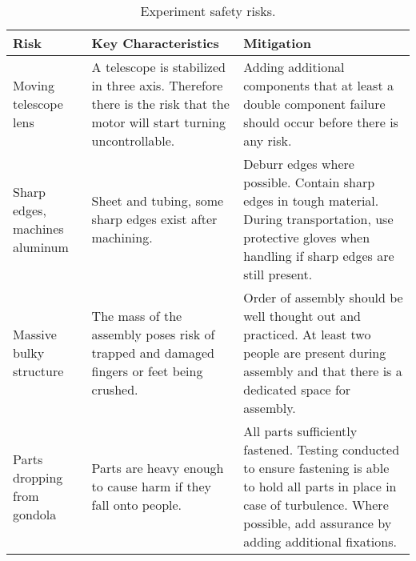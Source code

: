 \begin{table}[H]
    \centering
    \begin{tabular}{|m{}|m{}|m{}|}
    	\hline
    	\textbf{Risk} & \textbf{Key Characteristics} & \textbf{Mitigation} \\\hline
    	
    	Moving telescope lens & 
    	A telescope is stabilized in three axis. Therefore there is the risk that the motor will start turning uncontrollable. &
    	Adding additional components that at least a double component failure should occur before there is any risk. \\\hline
    	
    	Sharp edges, machines aluminum &
    	Sheet and tubing, some sharp edges exist after machining. &
    	Deburr edges where possible. Contain sharp edges in tough material. During transportation, use protective gloves when handling if sharp edges are still present. \\\hline
    	
    	Massive bulky structure &
    	The mass of the assembly poses risk of trapped and damaged fingers or feet being crushed. &
    	Order of assembly should be well thought out and practiced. At least two people are present during assembly and that there is a dedicated space for assembly. \\\hline
    	
    	Parts dropping from gondola &
    	Parts are heavy enough to cause harm if they fall onto people. &
    	All parts sufficiently fastened. Testing conducted to ensure fastening is able to hold all parts in place in case of turbulence. Where possible, add assurance by adding additional fixations. \\\hline
    
    \end{tabular}
    \caption{Experiment safety risks.}
    \label{tab:safrisk}
\end{table}